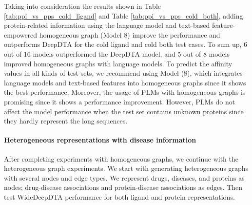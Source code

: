 

\newpage
Taking into consideration the results shown in Table \ref{tab:ppi_vs_pps_cold_ligand} and Table \ref{tab:ppi_vs_pps_cold_both}, adding protein-related information using the language model and text-based feature-empowered homogeneous graph (Model 8) improve the performance and outperforms DeepDTA for the cold ligand and cold both test cases. To sum up, 6 out of 16 models outperformed the DeepDTA model, and 5 out of 8 models improved homogeneous graphs with language models. To predict the affinity values in all kinds of test sets, we recommend using Model (8), which integrates language models and text-based features into homogeneous graphs since it shows the best performance. Moreover, the usage of PLMs with homogeneous graphs is promising since it shows a performance improvement. However, PLMs do not affect the model performance when the test set contains unknown proteins since they hardly represent the long sequences.

\paragraph{Heterogeneous representations with disease information}
After completing experiments with homogeneous graphs, we continue with the heterogeneous graph experiments. We start with generating heterogeneous graphs with several nodes and edge types. We represent drugs, diseases, and proteins as nodes; drug-disease associations and protein-disease associations as edges. Then test WideDeepDTA performance for both ligand and protein representations.

